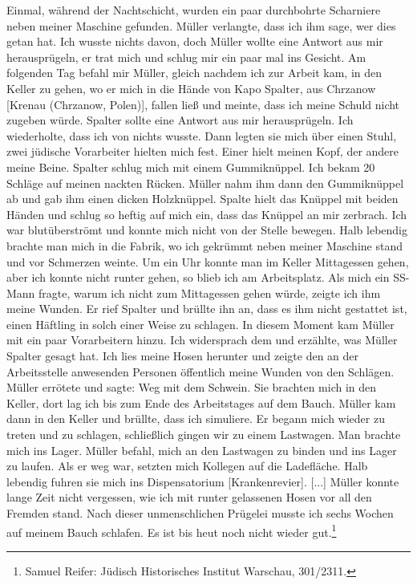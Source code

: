 \begin{leftbar}
Einmal, während der Nachtschicht, wurden ein paar durchbohrte Scharniere neben meiner Maschine gefunden. Müller verlangte, dass ich ihm sage, wer dies getan hat. Ich wusste nichts davon, doch Müller wollte eine Antwort aus mir herausprügeln, er trat mich und schlug mir ein paar mal ins Gesicht.\newline
Am folgenden Tag befahl mir Müller, gleich nachdem ich zur Arbeit kam, in den Keller zu gehen, wo er mich in die Hände von Kapo Spalter, aus Chrzanow [Krenau (Chrzanow, Polen)], fallen ließ und meinte, dass ich meine Schuld nicht zugeben würde. Spalter sollte eine Antwort aus mir herausprügeln. Ich wiederholte, dass ich von nichts wusste. Dann legten sie mich über einen Stuhl, zwei jüdische Vorarbeiter hielten mich fest. Einer hielt meinen Kopf, der andere meine Beine. Spalter schlug mich mit einem Gummiknüppel. Ich bekam 20 Schläge auf meinen nackten Rücken. Müller nahm ihm dann den Gummiknüppel ab und gab ihm einen dicken Holzknüppel. Spalte hielt das Knüppel mit beiden Händen und schlug so heftig auf mich ein, dass das Knüppel an mir zerbrach. Ich war blutüberströmt und konnte mich nicht von der Stelle bewegen. Halb lebendig brachte man mich in die Fabrik, wo ich gekrümmt neben meiner Maschine stand und vor Schmerzen weinte.\newline
Um ein Uhr konnte man im Keller Mittagessen gehen, aber ich konnte nicht runter gehen, so blieb ich am Arbeitsplatz. Als mich ein SS-Mann fragte, warum ich nicht zum Mittagessen gehen würde, zeigte ich ihm meine Wunden. Er rief Spalter und brüllte ihn an, dass es ihm nicht gestattet ist, einen Häftling in solch einer Weise zu schlagen. In diesem Moment kam Müller mit ein paar Vorarbeitern hinzu. Ich widersprach dem und erzählte, was Müller Spalter gesagt hat. Ich lies meine Hosen herunter und zeigte den an der Arbeitsstelle anwesenden Personen öffentlich meine Wunden von den Schlägen. Müller errötete und sagte: \glqq Weg mit dem Schwein\grqq. Sie brachten mich in den Keller, dort lag ich bis zum Ende des Arbeitstages auf dem Bauch. Müller kam dann in den Keller und brüllte, dass ich simuliere. Er begann mich wieder zu treten und zu schlagen, schließlich gingen wir zu einem Lastwagen. Man brachte mich ins Lager. Müller befahl, mich an den Lastwagen zu binden und ins Lager zu laufen. Als er weg war, setzten mich Kollegen auf die Ladefläche. Halb lebendig fuhren sie mich ins Dispensatorium [Krankenrevier]. [...]
Müller konnte lange Zeit nicht vergessen, wie ich mit runter gelassenen Hosen vor all den Fremden stand. Nach dieser unmenschlichen Prügelei musste ich sechs Wochen auf meinem Bauch schlafen. Es ist bis heut noch nicht wieder gut.\footnote{Samuel Reifer: Jüdisch Historisches Institut Warschau, 301/2311.}
\end{leftbar}

